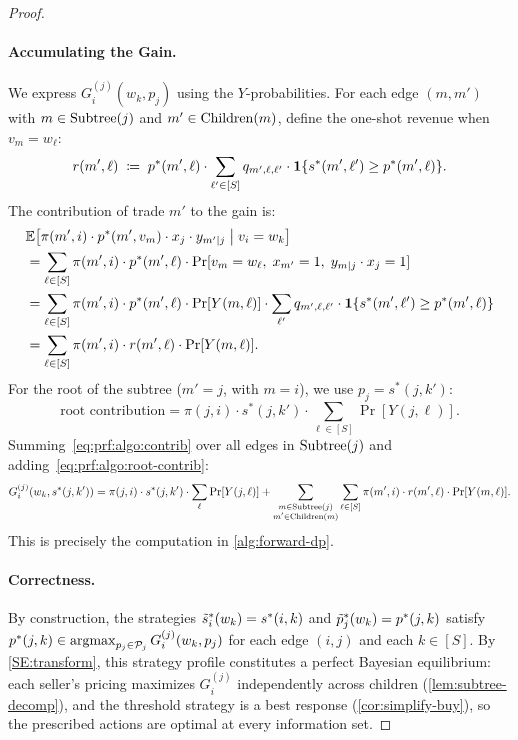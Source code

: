 \begin{proof}
\paragraph{Accumulating the Gain.}
We express $G^{(j)}_i(w_k, p_j)$ using the $Y$-probabilities. For each edge $(m, m')$ with $m \in \operatorname{Subtree}(j)$ and $m' \in \operatorname{Children}(m)$, define the one-shot revenue when $v_m = w_\ell$:
\begin{equation}
\label{eq:prf:algo:oneshot}
r(m', \ell) \;\coloneqq\; p^*(m', \ell) \cdot \sum_{\ell' \in [S]} q_{m',\ell,\ell'} \cdot \bm{1}\{s^*(m', \ell') \ge p^*(m', \ell)\}.
\end{equation}
The contribution of trade $m'$ to the gain is:
\begin{align}
&\mathbb{E}\big[\pi(m',i) \cdot p^*(m', v_m) \cdot x_j \cdot y_{m'|j} \;\big|\; v_i = w_k\big] \nonumber\\
&= \sum_{\ell \in [S]} \pi(m',i) \cdot p^*(m', \ell) \cdot \Pr[v_m = w_\ell,\; x_{m'} = 1,\; y_{m|j} \cdot x_j = 1] \nonumber\\
&= \sum_{\ell \in [S]} \pi(m',i) \cdot p^*(m', \ell) \cdot \Pr[Y(m,\ell)] \cdot \sum_{\ell'} q_{m',\ell,\ell'} \cdot \bm{1}\{s^*(m',\ell') \ge p^*(m',\ell)\} \nonumber\\
&= \sum_{\ell \in [S]} \pi(m',i) \cdot r(m', \ell) \cdot \Pr[Y(m,\ell)]. \label{eq:prf:algo:contrib}
\end{align}
For the root of the subtree ($m' = j$, with $m = i$), we use $p_j = s^*(j,k')$:
\begin{equation}
\label{eq:prf:algo:root-contrib}
\text{root contribution} = \pi(j,i) \cdot s^*(j,k') \cdot \sum_{\ell \in [S]} \Pr[Y(j,\ell)].
\end{equation}
Summing~\eqref{eq:prf:algo:contrib} over all edges in $\operatorname{Subtree}(j)$ and adding~\eqref{eq:prf:algo:root-contrib}:
\begin{equation}
\label{eq:prf:algo:gain-formula}
G^{(j)}_i(w_k, s^*(j,k')) = \pi(j,i) \cdot s^*(j,k') \cdot \sum_{\ell} \Pr[Y(j,\ell)] + \sum_{\substack{m \in \operatorname{Subtree}(j) \\ m' \in \operatorname{Children}(m)}} \sum_{\ell \in [S]} \pi(m',i) \cdot r(m',\ell) \cdot \Pr[Y(m,\ell)].
\end{equation}
This is precisely the computation in \cref{alg:forward-dp}.

\paragraph{Correctness.}
By construction, the strategies $\tilde{s}^*_i(w_k) = s^*(i,k)$ and $\tilde{p}^*_j(w_k) = p^*(j,k)$ satisfy $p^*(j,k) \in \operatorname*{argmax}_{p_j \in \mathcal{P}_j} G^{(j)}_i(w_k, p_j)$ for each edge $(i,j)$ and each $k \in [S]$. By \eqref{SE:transform}, this strategy profile constitutes a perfect Bayesian equilibrium: each seller's pricing maximizes $G^{(j)}_i$ independently across children (\cref{lem:subtree-decomp}), and the threshold strategy is a best response (\cref{cor:simplify-buy}), so the prescribed actions are optimal at every information set.


\end{proof}
